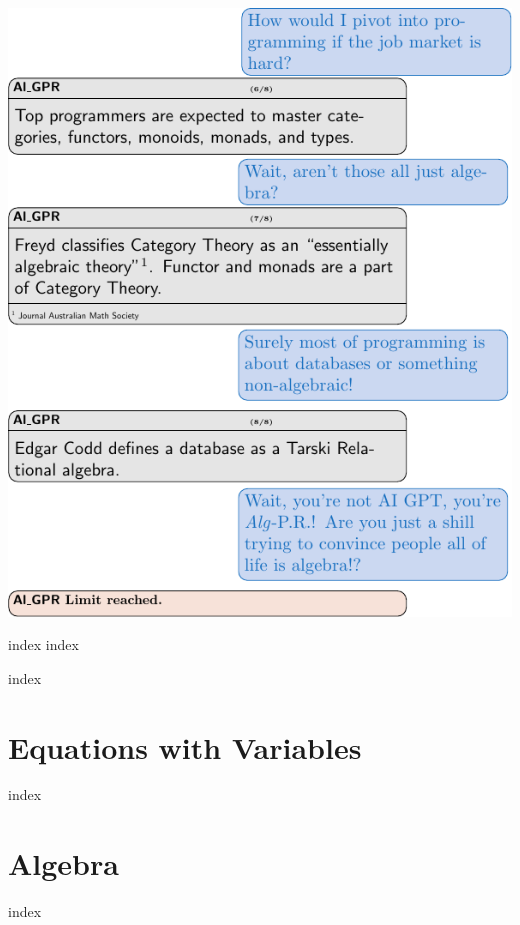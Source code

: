 \documentclass[12pt,twoside,letterpaper]{memoir}
\begin{document}
\includegraphics[width=\textwidth]{3-operators/AlGPR2.pdf}

{index}
{index}

{index}


\part{Equations with Variables}

{index}

\part{Algebra}
{index}
\end{document}

